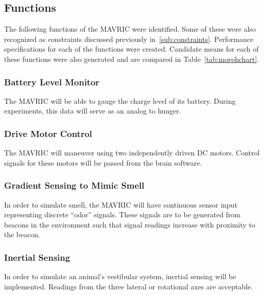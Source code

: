 \documentclass{article}
\begin{document}
    \subsection{Functions}
        \label{sub:functions}
        
        The following functions of the MAVRIC were identified.
        Some of these were also recognized as constraints
        discussed previously in~\ref{sub:constraints}.
        Performance specifications for each of the functions were created.
        Candidate means for each of these functions were also generated
        and are compared in Table~\ref{tab:morphchart}.

        \subsubsection{Battery Level Monitor}
        
            The MAVRIC will be able to gauge the charge level of its battery.
            During experiments, this data will serve as an analog to hunger.

        \subsubsection{Drive Motor Control}
        
            The MAVRIC will maneuver using two independently driven DC motors.
            Control signals for these motors will be passed
            from the brain software.

        \subsubsection{Gradient Sensing to Mimic Smell}
        
            In order to simulate smell,
            the MAVRIC will have continuous sensor input
            representing discrete ``odor'' signals.
            These signals are to be generated from beacons in the environment
            such that signal readings increase with proximity to the beacon.

        \subsubsection{Inertial Sensing}
        
            In order to simulate an animal's vestibular system,
            inertial sensing will be implemented.
            Readings from the three lateral or rotational axes
            are acceptable.
\end{document}
